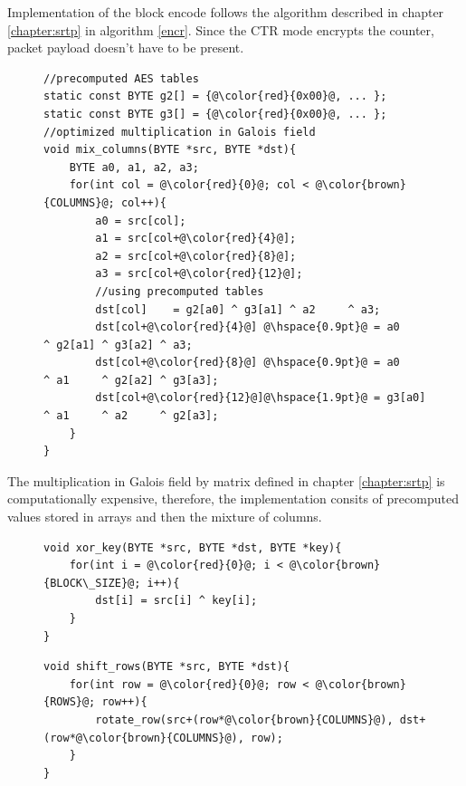 Implementation of the block encode follows the algorithm described in chapter
\ref{chapter:srtp} in algorithm \ref{encr}. Since the CTR mode encrypts the
counter, packet payload doesn't have to be present. 

\begin{figure}[H]
\begin{lstlisting}
//precomputed AES tables
static const BYTE g2[] = {@\color{red}{0x00}@, ... };
static const BYTE g3[] = {@\color{red}{0x00}@, ... };
//optimized multiplication in Galois field
void mix_columns(BYTE *src, BYTE *dst){
    BYTE a0, a1, a2, a3;
    for(int col = @\color{red}{0}@; col < @\color{brown}{COLUMNS}@; col++){ 
        a0 = src[col]; 
        a1 = src[col+@\color{red}{4}@];
        a2 = src[col+@\color{red}{8}@];
        a3 = src[col+@\color{red}{12}@];
        //using precomputed tables
        dst[col]    = g2[a0] ^ g3[a1] ^ a2     ^ a3;
        dst[col+@\color{red}{4}@] @\hspace{0.9pt}@ = a0     ^ g2[a1] ^ g3[a2] ^ a3;
        dst[col+@\color{red}{8}@] @\hspace{0.9pt}@ = a0     ^ a1     ^ g2[a2] ^ g3[a3];
        dst[col+@\color{red}{12}@]@\hspace{1.9pt}@ = g3[a0] ^ a1     ^ a2     ^ g2[a3];
    }
}
\end{lstlisting}
\end{figure}
The multiplication in Galois field by matrix defined in chapter 
\ref{chapter:srtp} is computationally expensive, therefore, the implementation
consits of precomputed values stored in arrays and then the mixture of columns.

\begin{figure}[H]
\begin{lstlisting}
void xor_key(BYTE *src, BYTE *dst, BYTE *key){
    for(int i = @\color{red}{0}@; i < @\color{brown}{BLOCK\_SIZE}@; i++){
        dst[i] = src[i] ^ key[i];
    }
}
\end{lstlisting}
\end{figure}



\begin{figure}[H]
\begin{lstlisting}
void shift_rows(BYTE *src, BYTE *dst){   
    for(int row = @\color{red}{0}@; row < @\color{brown}{ROWS}@; row++){
        rotate_row(src+(row*@\color{brown}{COLUMNS}@), dst+(row*@\color{brown}{COLUMNS}@), row);
    }
}
\end{lstlisting}
\end{figure}

